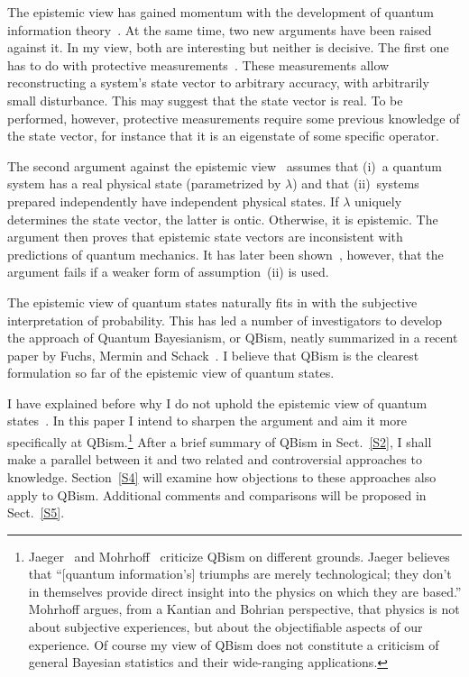 \documentclass[12pt]{article}
\begin{document}
The epistemic view
has gained momentum with the development
of quantum information theory~\cite{fuchs1}.
At the same time, two new arguments have
been raised against it.  In my view, both
are interesting but neither is
decisive.  The first one has to do with
protective measurements~\cite{aharonov}.
These measurements allow reconstructing
a system's state vector to arbitrary
accuracy, with arbitrarily small
disturbance.  This may suggest that the
state vector is real.  To be performed,
however, protective measurements require
some previous knowledge of the state
vector, for instance that it is an
eigenstate of some specific operator.

The second argument against the epistemic
view~\cite{pusey} assumes that (i)~a
quantum system has a real physical state
(parametrized by $\lambda$) and that
(ii)~systems prepared independently have
independent physical states.  If $\lambda$
uniquely determines the state vector,
the latter is ontic. Otherwise, it is
epistemic.  The argument then proves that
epistemic state vectors are inconsistent
with predictions of quantum mechanics.
It has later been shown~\cite{emerson},
however, that the argument fails if a
weaker form of assumption~(ii) is used.

The epistemic view of quantum states
naturally fits in with the subjective
interpretation of probability.  This has
led a number of investigators to develop
the approach of Quantum Bayesianism, or
QBism, neatly summarized in a recent paper
by Fuchs, Mermin and Schack~\cite{fuchs2}.
I believe that QBism is the clearest
formulation so far of the epistemic view
of quantum states.

I have explained before why I do not
uphold the epistemic view of quantum
states~\cite{marchildon1,marchildon2}. 
In this paper I intend to sharpen the
argument and aim it more specifically
at QBism.\footnote{Jaeger~\cite{jaeger}
and Mohrhoff~\cite{mohrhoff} criticize
QBism on different grounds.  Jaeger believes
that ``[quantum information's] triumphs
are merely technological; they don't in
themselves provide direct insight into the
physics on which they are based.''  Mohrhoff
argues, from a Kantian and Bohrian
perspective, that physics is not about
subjective experiences, but about the
objectifiable aspects of our experience.
Of course my view of QBism does not
constitute a criticism of general
Bayesian statistics and their
wide-ranging applications.}
After a brief summary of QBism in
Sect.~\ref{S2}, I shall make a parallel between
it and two related and controversial approaches
to knowledge.  Section~\ref{S4} will examine
how objections to these approaches also
apply to QBism.  Additional comments and
comparisons will be proposed in Sect.~\ref{S5}.
%
\end{document}

